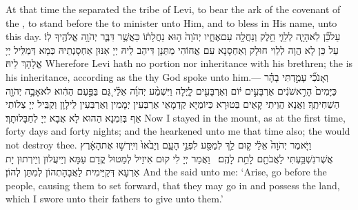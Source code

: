 {At that time the \lord\space separated the tribe of Levi, to bear the ark of the covenant of the \lord, to stand before the \lord\space to minister unto Him, and to bless in His name, unto this day.}{}
{עַל\maqqaf כֵּ֞ן לֹֽא\maqqaf הָיָ֧ה לְלֵוִ֛י חֵ֥לֶק וְנַחֲלָ֖ה עִם\maqqaf אֶחָ֑יו יְהֹוָה֙ ה֣וּא נַחֲלָת֔וֹ כַּאֲשֶׁ֥ר דִּבֶּ֛ר יְהֹוָ֥ה אֱלֹהֶ֖יךָ לֽוֹ׃}
{עַל כֵּן לָא הֲוָה לְלֵוִי חוּלָק וְאַחְסָנָא עִם אֲחוֹהִי מַתְּנָן דִּיהַב לֵיהּ יְיָ אִנּוּן אַחְסָנְתֵיהּ כְּמָא דְּמַלֵּיל יְיָ אֱלָהָךְ לֵיהּ׃}
{Wherefore Levi hath no portion nor inheritance with his brethren; the \lord\space is his inheritance, according as the \lord\space thy God spoke unto him.—}{}
{וְאָנֹכִ֞י עָמַ֣דְתִּי בָהָ֗ר כַּיָּמִים֙ הָרִ֣אשֹׁנִ֔ים אַרְבָּעִ֣ים י֔וֹם וְאַרְבָּעִ֖ים לָ֑יְלָה וַיִּשְׁמַ֨ע יְהֹוָ֜ה אֵלַ֗י גַּ֚ם בַּפַּ֣עַם הַהִ֔וא לֹא\maqqaf אָבָ֥ה יְהֹוָ֖ה הַשְׁחִיתֶֽךָ׃}
{וַאֲנָא הֲוֵיתִי קָאֵים בְּטוּרָא כְּיוֹמַיָּא קַדְמָאֵי אַרְבְּעִין יְמָמִין וְאַרְבְּעִין לֵילָוָן וְקַבֵּיל יְיָ צְלוֹתִי אַף בְּזִמְנָא הַהוּא לָא אֲבָא יְיָ לְחַבָּלוּתָךְ׃}
{Now I stayed in the mount, as at the first time, forty days and forty nights; and the \lord\space hearkened unto me that time also; the \lord\space would not destroy thee.}{}
{וַיֹּ֤אמֶר יְהֹוָה֙ אֵלַ֔י ק֛וּם לֵ֥ךְ לְמַסַּ֖ע לִפְנֵ֣י הָעָ֑ם וְיָבֹ֙אוּ֙ וְיִֽירְשׁ֣וּ אֶת\maqqaf הָאָ֔רֶץ אֲשֶׁר\maqqaf נִשְׁבַּ֥עְתִּי לַאֲבֹתָ֖ם לָתֵ֥ת לָהֶֽם׃ \petucha }
{וַאֲמַר יְיָ לִי קוּם אִיזֵיל לְמַטוּל קֳדָם עַמָּא וְיֵיעֲלוּן וְיֵירְתוּן יָת אַרְעָא דְּקַיֵּימִית לַאֲבָהָתְהוֹן לְמִתַּן לְהוֹן׃}
{And the \lord\space said unto me: ‘Arise, go before the people, causing them to set forward, that they may go in and possess the land, which I swore unto their fathers to give unto them.’}{}
